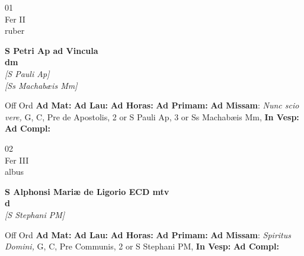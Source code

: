 \documentclass[10pt, openany]{book}
\begin{document}
    \begin{center}
        \begin{minipage}{3.5in}
            \vspace{2em}
            \begin{minipage}{0.5in}
                {\Huge 01} \\
                {\normalsize Fer II} \\
                {\normalsize ruber}
            \end{minipage}
            \begin{minipage}{3.0in}
                \textbf{ \large S Petri Ap ad Vincula \\
                \textnormal{\normalsize dm}} \\ \textit{[S Pauli Ap]} \\ \textit{[Ss Machabæis Mm]} \\ 
            \end{minipage}
            \begin{justify}Off Ord
                \textbf{Ad Mat: }
                \textbf{Ad Lau: }
                \textbf{Ad Horas: }
                \textbf{Ad Primam: }\textbf{Ad Missam}: \textit{Nunc scio vere,} G, C, Pre de Apostolis, 2 or S Pauli Ap, 3 or Ss Machabæis Mm,  
                \textbf{In Vesp: }
                \textbf{Ad Compl: }
            \end{justify}
        \end{minipage}
    \end{center}

    \begin{center}
        \begin{minipage}{3.5in}
            \vspace{2em}
            \begin{minipage}{0.5in}
                {\Huge 02} \\
                {\normalsize Fer III} \\
                {\normalsize albus}
            \end{minipage}
            \begin{minipage}{3.0in}
                \textbf{ \large S Alphonsi Mariæ de Ligorio ECD mtv \\
                \textnormal{\normalsize d}} \\ \textit{[S Stephani PM]} \\ 
            \end{minipage}
            \begin{justify}Off Ord
                \textbf{Ad Mat: }
                \textbf{Ad Lau: }
                \textbf{Ad Horas: }
                \textbf{Ad Primam: }\textbf{Ad Missam}: \textit{Spiritus Domini,} G, C, Pre Communis, 2 or S Stephani PM,  
                \textbf{In Vesp: }
                \textbf{Ad Compl: }
            \end{justify}
        \end{minipage}
    \end{center}
\end{document}
